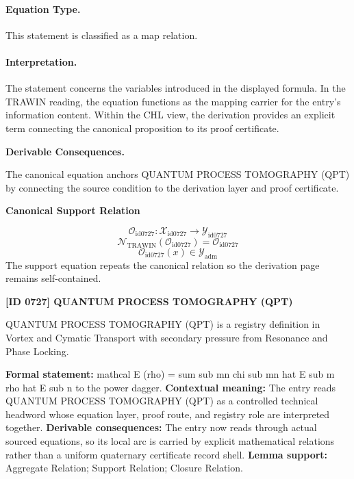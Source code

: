 \paragraph{Equation Type.}
This statement is classified as a map relation.

\paragraph{Interpretation.}
The statement concerns the variables introduced in the displayed formula. In the TRAWIN reading, the equation functions as the mapping carrier for the entry’s information content. Within the CHL view, the derivation provides an explicit term connecting the canonical proposition to its proof certificate.

\par\vspace{0.35em}
\noindent\textbf{Derivable Consequences.}\quad
\begingroup
\footnotesize
\raggedright
The canonical equation anchors QUANTUM PROCESS TOMOGRAPHY (QPT) by connecting the source condition to the derivation layer and proof certificate.
\par\endgroup

\noindent\textbf{Canonical Support Relation}\par
\[
\mathcal{O}_{\mathrm{id0727}}:\mathcal{X}_{\mathrm{id0727}}\longrightarrow\mathcal{Y}_{\mathrm{id0727}}
\]
\[
\mathcal{N}_{\mathrm{TRAWIN}}(\mathcal{O}_{\mathrm{id0727}})=\mathcal{O}_{\mathrm{id0727}}
\]
\[
\mathcal{O}_{\mathrm{id0727}}(x)\in\mathcal{Y}_{\mathrm{adm}}
\]
\noindent The support equation repeats the canonical relation so the derivation page remains self-contained.\par

\clearpage
\noindent\textbf{[ID 0727] QUANTUM PROCESS TOMOGRAPHY (QPT)}\par
\vspace{0.35em}
\begingroup\small
{}
QUANTUM PROCESS TOMOGRAPHY (QPT) is a registry definition in Vortex and Cymatic Transport with secondary pressure from Resonance and Phase Locking.

\begingroup\footnotesize\setlength{\emergencystretch}{3em}\sloppy
\textbf{Formal statement:} mathcal E (rho) = sum sub mn chi sub mn hat E sub m rho hat E sub n to the power dagger. \textbf{Contextual meaning:} The entry reads QUANTUM PROCESS TOMOGRAPHY (QPT) as a controlled technical headword whose equation layer, proof route, and registry role are interpreted together. \textbf{Derivable consequences:} The entry now reads through actual sourced equations, so its local arc is carried by explicit mathematical relations rather than a uniform quaternary certificate record shell. \textbf{Lemma support:} Aggregate Relation; Support Relation; Closure Relation.\par
\endgroup


